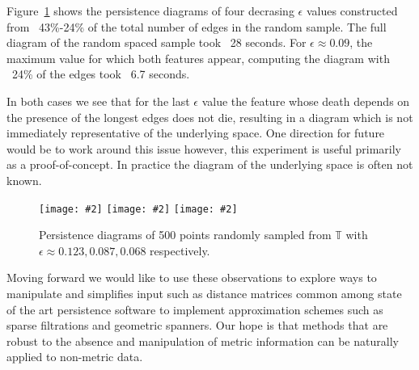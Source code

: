 \documentclass[11pt]{article}
\newcommand{\bottomleft}[2]{\texttt{[image: \#2]}}
\begin{document}
Figure~\ref{fig:random_e} shows the persistence diagrams of four decrasing $\epsilon$ values constructed from ~43\%-24\% of the total number of edges in the random sample.
The full diagram of the random spaced sample took ~28 seconds.
For $\epsilon\approx 0.09$, the maximum value for which both features appear, computing the diagram with ~24\% of the edges took ~6.7 seconds.

In both cases we see that for the last $\epsilon$ value the feature whose death depends on the presence of the longest edges does not die, resulting in a diagram which is not immediately representative of the underlying space.
One direction for future would be to work around this issue however, this experiment is useful primarily as a proof-of-concept.
In practice the diagram of the underlying space is often not known.

\begin{figure}[ht]
        \centering
        \bottomleft{0.32}{{figures/500random5.0}.pdf}
        \bottomleft{0.32}{{figures/500random7.0}.pdf}
        \bottomleft{0.32}{{figures/500random9.0}.pdf}
        \caption{Persistence diagrams of 500 points randomly sampled from $\mathbb{T}$ with $\epsilon\approx 0.123,0.087,0.068$ respectively.}\label{fig:random_e}
\end{figure}


Moving forward we would like to use these observations to explore ways to manipulate and simplifies input such as distance matrices common among state of the art persistence software to implement approximation schemes such as sparse filtrations and geometric spanners.
Our hope is that methods that are robust to the absence and manipulation of metric information can be naturally applied to non-metric data.
\end{document}
